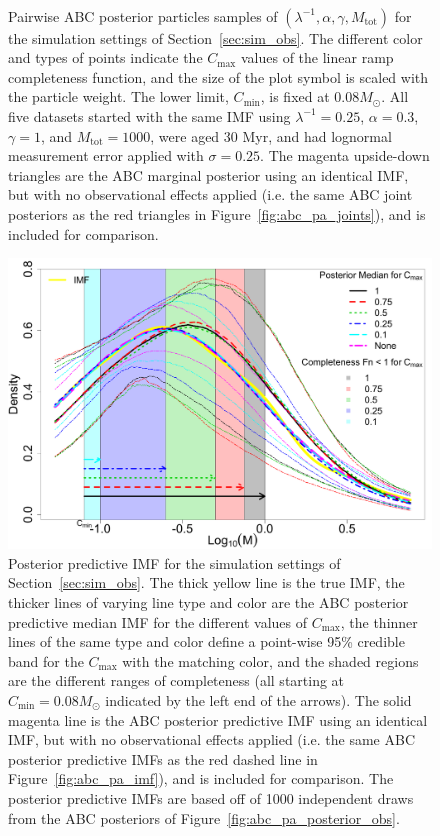 \documentclass[ejs]{imsart}
\numberwithin{equation}{section}
\theoremstyle{plain}
\newcommand{\Msun}{M_{\odot}}
\newcommand{\Cmin}{C_{\text{min}}}
\newcommand{\Cmax}{C_{\text{max}}}
\newcommand{\Mtot}{M_{\text{tot}}}
\begin{document}
\begin{figure}[htbp]
\begin{subfigure}{0.32\textwidth}
\end{subfigure} \\
\caption{Pairwise ABC posterior particles samples of $(\lambda^{-1}, \alpha, \gamma, \Mtot)$ for the simulation settings of Section~\ref{sec:sim_obs}.  The different color and types of points indicate the $\Cmax$ values of the linear ramp completeness function, and the size of the plot symbol is scaled with the particle weight.  
The lower limit, $\Cmin$, is fixed at 0.08$\Msun$.  
All five datasets started with the same IMF using $\lambda^{-1} = 0.25$, $\alpha = 0.3$, $\gamma = 1$, and $\Mtot = 1000$, were aged 30 Myr, and had lognormal measurement error applied with $\sigma = 0.25$.
The magenta upside-down triangles are the ABC marginal posterior using an identical IMF, but with no observational effects applied (i.e. the same ABC joint posteriors as the red triangles in Figure~\ref{fig:abc_pa_joints}), and is included for comparison.
}
\label{fig:abc_pa_joints_obs}
\end{figure}



\begin{figure}[htbp]
\centering
\includegraphics[width=.85\textwidth]{figures/obs_pred_imf.pdf}
 \caption{Posterior predictive IMF for the simulation settings of Section~\ref{sec:sim_obs}. 
The thick yellow line is the true IMF, the thicker lines of varying line type and color are the ABC posterior predictive median IMF for the different values of $\Cmax$, 
the thinner lines of the same type and color define a point-wise 95\% credible band  for the $\Cmax$ with the matching color, and
the shaded regions are the different ranges of completeness (all starting at $\Cmin = 0.08 \Msun$ indicated by the left end of the arrows).
The solid magenta line is the ABC posterior predictive IMF using an identical IMF, but with no observational effects applied (i.e. the same ABC posterior predictive IMFs as the red dashed line in Figure~\ref{fig:abc_pa_imf}), and is included for comparison.
The posterior predictive IMFs are based off of 1000 independent draws from the ABC posteriors of Figure~\ref{fig:abc_pa_posterior_obs}.  
} \label{fig:abc_pa_pred_obs}
\end{figure}
\end{document}
